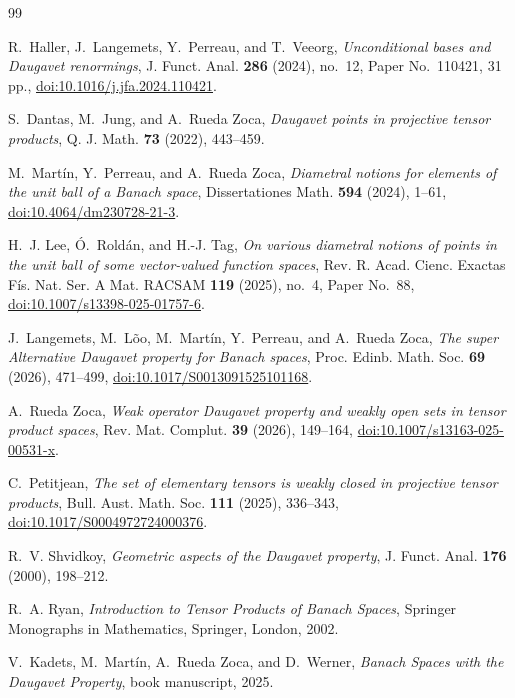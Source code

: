 \documentclass[11pt]{article}
\theoremstyle{definition}
\begin{document}
\begin{thebibliography}{99}

R.~Haller, J.~Langemets, Y.~Perreau, and T.~Veeorg,
\emph{Unconditional bases and Daugavet renormings},
J. Funct. Anal. \textbf{286} (2024), no.~12, Paper No.~110421, 31 pp.,
\href{https://doi.org/10.1016/j.jfa.2024.110421}{doi:10.1016/j.jfa.2024.110421}.

S.~Dantas, M.~Jung, and A.~Rueda Zoca,
\emph{Daugavet points in projective tensor products},
Q. J. Math. \textbf{73} (2022), 443--459.

M.~Martín, Y.~Perreau, and A.~Rueda Zoca,
\emph{Diametral notions for elements of the unit ball of a Banach space},
Dissertationes Math. \textbf{594} (2024), 1--61,
\href{https://doi.org/10.4064/dm230728-21-3}{doi:10.4064/dm230728-21-3}.

H.~J. Lee, Ó.~Roldán, and H.-J. Tag,
\emph{On various diametral notions of points in the unit ball of some
vector-valued function spaces},
Rev. R. Acad. Cienc. Exactas Fís. Nat. Ser. A Mat. RACSAM
\textbf{119} (2025), no.~4, Paper No.~88,
\href{https://doi.org/10.1007/s13398-025-01757-6}{doi:10.1007/s13398-025-01757-6}.

J.~Langemets, M.~L\~oo, M.~Mart\'in, Y.~Perreau, and A.~Rueda Zoca,
\emph{The super Alternative Daugavet property for Banach spaces},
Proc. Edinb. Math. Soc. \textbf{69} (2026), 471--499,
\href{https://doi.org/10.1017/S0013091525101168}{doi:10.1017/S0013091525101168}.

A.~Rueda Zoca,
\emph{Weak operator Daugavet property and weakly open sets in tensor product
spaces},
Rev. Mat. Complut. \textbf{39} (2026), 149--164,
\href{https://doi.org/10.1007/s13163-025-00531-x}{doi:10.1007/s13163-025-00531-x}.

C.~Petitjean,
\emph{The set of elementary tensors is weakly closed in projective tensor
products},
Bull. Aust. Math. Soc. \textbf{111} (2025), 336--343,
\href{https://doi.org/10.1017/S0004972724000376}{doi:10.1017/S0004972724000376}.

R.~V. Shvidkoy,
\emph{Geometric aspects of the Daugavet property},
J. Funct. Anal. \textbf{176} (2000), 198--212.

R.~A. Ryan,
\emph{Introduction to Tensor Products of Banach Spaces},
Springer Monographs in Mathematics, Springer, London, 2002.

V.~Kadets, M.~Martín, A.~Rueda Zoca, and D.~Werner,
\emph{Banach Spaces with the Daugavet Property}, book manuscript, 2025.

\end{thebibliography}
\end{document}
